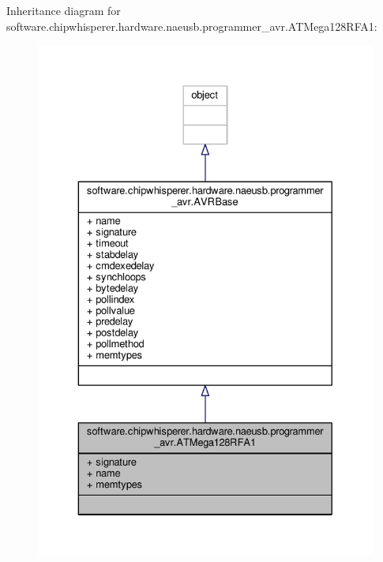 Inheritance diagram for software.\+chipwhisperer.\+hardware.\+naeusb.\+programmer\+\_\+avr.\+A\+T\+Mega128\+R\+F\+A1\+:\nopagebreak
\begin{figure}[H]
\begin{center}
\leavevmode
\includegraphics[width=329pt]{d2/d18/classsoftware_1_1chipwhisperer_1_1hardware_1_1naeusb_1_1programmer__avr_1_1ATMega128RFA1__inherit__graph}
\end{center}
\end{figure}


